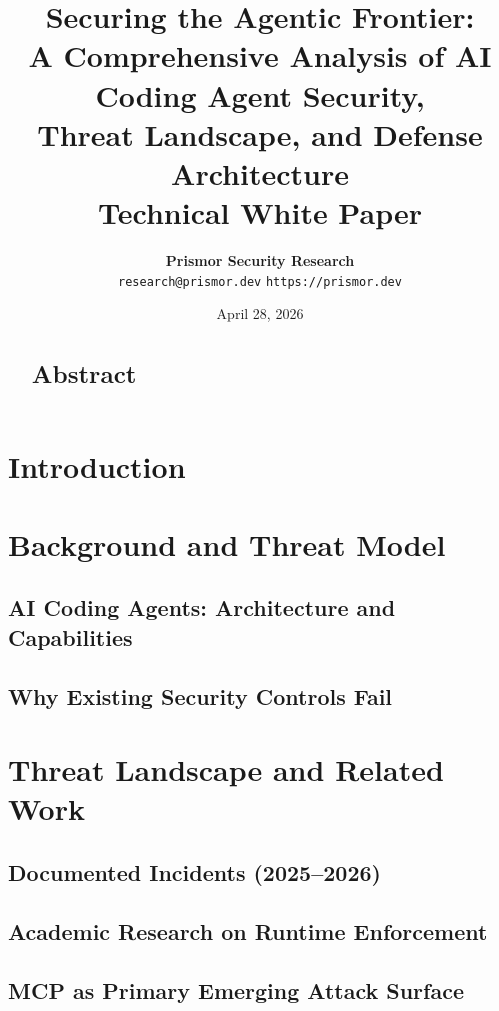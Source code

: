 \documentclass[11pt,letterpaper]{article}
\title{
    \vspace{-1cm}
    {\Large\bfseries\color{prismorblue} Securing the Agentic Frontier:}\\
    \vspace{0.3em}
    {\large A Comprehensive Analysis of AI Coding Agent Security,\\
    Threat Landscape, and Defense Architecture}\\
    \vspace{0.5em}
    \normalsize\color{prismorgray}
    Technical White Paper\\
    \vspace{0.3em}
}
\author{
    \textbf{Prismor Security Research}\\
    \small\texttt{research@prismor.dev} \quad \texttt{https://prismor.dev}\\
    \vspace{0.5em}
}
\date{\small April 28, 2026}
\begin{document}
\maketitle
\thispagestyle{fancy}

\begin{abstract}
\section*{Abstract}
\end{abstract}

\tableofcontents
\clearpage

\section{Introduction}

\section{Background and Threat Model}

\subsection{AI Coding Agents: Architecture and Capabilities}

\subsection{Why Existing Security Controls Fail}

\section{Threat Landscape and Related Work}

\subsection{Documented Incidents (2025--2026)}

\subsection{Academic Research on Runtime Enforcement}

\subsection{MCP as Primary Emerging Attack Surface}
\end{document}
